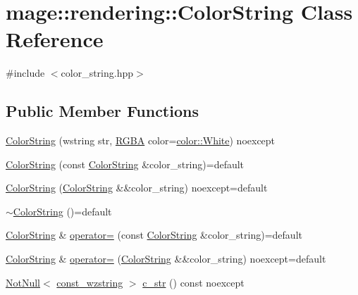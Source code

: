\hypertarget{classmage_1_1rendering_1_1_color_string}{}\section{mage\+:\+:rendering\+:\+:Color\+String Class Reference}
\label{classmage_1_1rendering_1_1_color_string}


{\ttfamily \#include $<$color\+\_\+string.\+hpp$>$}

\subsection*{Public Member Functions}
\begin{DoxyCompactItemize}
\item 
\hyperlink{classmage_1_1rendering_1_1_color_string_af574d1a87d78ed0315f4f6279cd167ae}{Color\+String} (wstring str, \hyperlink{structmage_1_1_r_g_b_a}{R\+G\+BA} color=\hyperlink{namespacemage_1_1color_a39aae61faf172a41b44e2d308e1e4da6}{color\+::\+White}) noexcept
\item 
\hyperlink{classmage_1_1rendering_1_1_color_string_a386454b4a8e08707e8ffff8451509de5}{Color\+String} (const \hyperlink{classmage_1_1rendering_1_1_color_string}{Color\+String} \&color\+\_\+string)=default
\item 
\hyperlink{classmage_1_1rendering_1_1_color_string_a642793608186e9ac9931827ae9f0c57a}{Color\+String} (\hyperlink{classmage_1_1rendering_1_1_color_string}{Color\+String} \&\&color\+\_\+string) noexcept=default
\item 
\hyperlink{classmage_1_1rendering_1_1_color_string_a13ab2218e1cbe99241283214e455f3c9}{$\sim$\+Color\+String} ()=default
\item 
\hyperlink{classmage_1_1rendering_1_1_color_string}{Color\+String} \& \hyperlink{classmage_1_1rendering_1_1_color_string_ab42304d36628f21263a4d545831b3829}{operator=} (const \hyperlink{classmage_1_1rendering_1_1_color_string}{Color\+String} \&color\+\_\+string)=default
\item 
\hyperlink{classmage_1_1rendering_1_1_color_string}{Color\+String} \& \hyperlink{classmage_1_1rendering_1_1_color_string_aa70b60e0c8528306e7473ee0b5bfbe03}{operator=} (\hyperlink{classmage_1_1rendering_1_1_color_string}{Color\+String} \&\&color\+\_\+string) noexcept=default
\item 
\hyperlink{namespacemage_a8769f9d670d6b585ea306cb1062af94b}{Not\+Null}$<$ \hyperlink{namespacemage_ac409e0f2a22292a3a4cd42742994fbf0}{const\+\_\+wzstring} $>$ \hyperlink{classmage_1_1rendering_1_1_color_string_a2706724097d2ad5c187d34db49d86bda}{c\+\_\+str} () const noexcept

\end{DoxyCompactItemize}
